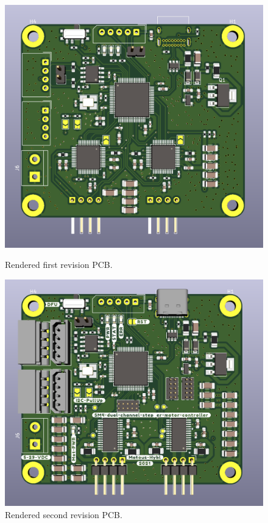 \begin{figure}[H]
    \begin{minipage}[t]{0.45\textwidth}
        \centering
        \includegraphics[height=0.8\textwidth]{obrazky/pcb_rev1}
        \caption{Rendered first revision PCB.}
        \label{fig:pcb1}
    \end{minipage}\hfill
    \begin{minipage}[t]{0.45\textwidth}
        \centering
        \includegraphics[height=0.8\textwidth]{obrazky/pcb_rev2}
        \caption{Rendered second revision PCB.}
        \label{fig:pcb2}
    \end{minipage}
\end{figure}
